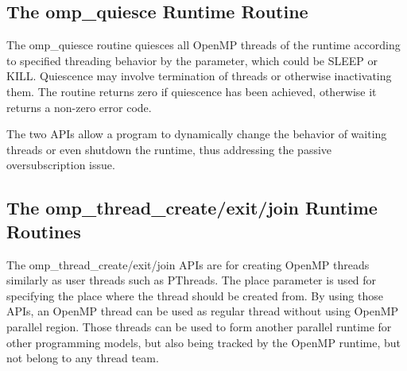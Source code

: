 \subsection{The {\sf omp\_quiesce} Runtime Routine}
The {\sf omp\_quiesce} routine quiesces all OpenMP threads of the runtime according to 
specified threading behavior by the parameter, which could be SLEEP or KILL. 
Quiescence may involve termination of threads or otherwise inactivating them. The routine returns zero if quiescence has been achieved, otherwise it returns a non-zero error code.

The two APIs allow a program to dynamically change the behavior of waiting threads or even shutdown the runtime, thus addressing the passive
oversubscription issue. 


\subsection{The {\sf omp\_thread\_create/exit/join} Runtime Routines}

The {\sf omp\_thread\_create/exit/join} APIs are for creating OpenMP threads similarly as user threads such 
as PThreads. The {\sf place} parameter is used for specifying the place where the thread should be created from.  
By using those APIs, an OpenMP thread
can be used as regular thread without using OpenMP parallel region. Those threads can be used to form another parallel runtime for other programming
models, but also being tracked by the OpenMP runtime, but not belong to any thread team. 


